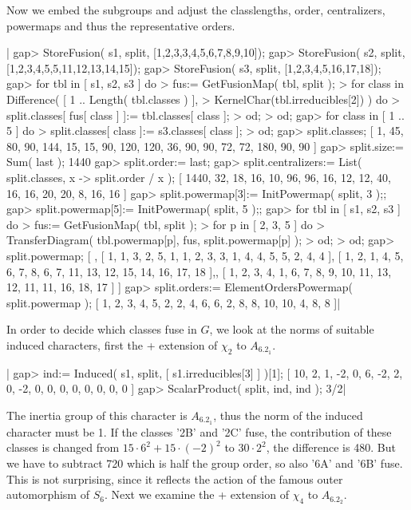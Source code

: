 Now  we   embed  the  subgroups  and  adjust  the   classlengths,  order,
centralizers, powermaps and thus the representative orders.

|    gap> StoreFusion( s1, split, [1,2,3,3,4,5,6,7,8,9,10]);
    gap> StoreFusion( s2, split, [1,2,3,4,5,5,11,12,13,14,15]);
    gap> StoreFusion( s3, split, [1,2,3,4,5,16,17,18]);
    gap> for tbl in [ s1, s2, s3 ] do
    >      fus:= GetFusionMap( tbl, split );
    >      for class in Difference( [ 1 .. Length( tbl.classes ) ],
    >                               KernelChar(tbl.irreducibles[2]) ) do
    >        split.classes[ fus[ class ] ]:= tbl.classes[ class ];
    >      od;
    >    od;
    gap> for class in [ 1 .. 5 ] do
    >      split.classes[ class ]:= s3.classes[ class ];
    >    od;
    gap> split.classes;
    [ 1, 45, 80, 90, 144, 15, 15, 90, 120, 120, 36, 90, 90, 72, 72, 180,
      90, 90 ]
    gap> split.size:= Sum( last );
    1440
    gap> split.order:= last;
    gap> split.centralizers:= List( split.classes, x -> split.order / x );
    [ 1440, 32, 18, 16, 10, 96, 96, 16, 12, 12, 40, 16, 16, 20, 20, 8,
      16, 16 ]
    gap> split.powermap[3]:= InitPowermap( split, 3 );;
    gap> split.powermap[5]:= InitPowermap( split, 5 );;
    gap> for tbl in [ s1, s2, s3 ] do
    >      fus:= GetFusionMap( tbl, split );
    >      for p in [ 2, 3, 5 ] do
    >        TransferDiagram( tbl.powermap[p], fus, split.powermap[p] );
    >      od;
    >    od;
    gap> split.powermap;
    [ , [ 1, 1, 3, 2, 5, 1, 1, 2, 3, 3, 1, 4, 4, 5, 5, 2, 4, 4 ],
      [ 1, 2, 1, 4, 5, 6, 7, 8, 6, 7, 11, 13, 12, 15, 14, 16, 17, 18 ],,
      [ 1, 2, 3, 4, 1, 6, 7, 8, 9, 10, 11, 13, 12, 11, 11, 16, 18, 17 ] ]
    gap> split.orders:= ElementOrdersPowermap( split.powermap );
    [ 1, 2, 3, 4, 5, 2, 2, 4, 6, 6, 2, 8, 8, 10, 10, 4, 8, 8 ]|

In  order to decide which classes  fuse in $G$, we look  at  the norms of
suitable  induced  characters,  first  the  + extension  of  $\chi_2$  to
$A_6.2_1$.

|    gap> ind:= Induced( s1, split, [ s1.irreducibles[3] ] )[1];
    [ 10, 2, 1, -2, 0, 6, -2, 2, 0, -2, 0, 0, 0, 0, 0, 0, 0, 0 ]
    gap> ScalarProduct( split, ind, ind );
    3/2|

The inertia group  of this character is $A_6.2_1$,  thus  the norm of the
induced character  must be 1.  If  the classes  '2B' and '2C'  fuse,  the
contribution of these classes is changed from $15\cdot 6^2+15\cdot(-2)^2$
to $30  \cdot  2^2$, the difference is 480.  But we have to subtract  720
which is half the group  order, so also '6A' and  '6B' fuse.  This is not
surprising, since it reflects the action of the famous outer automorphism
of $S_6$.  Next we examine the + extension of $\chi_4$ to $A_6.2_2$.

